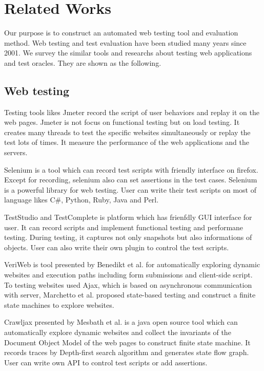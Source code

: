 
\chapter{Related Works}\label{ch:related}

Our purpose is to construct an automated web testing tool and evaluation method.
Web testing and test evaluation have been studied many years since 2001\cite{WebTesting}.
We survey the similar tools\cite{WebToolsList}  and researchs about testing web applications and test oracles.
They are shown as the following.


\section{Web testing}

Testing tools likes Jmeter\cite{jmeter} record the script of user behaviors and replay it on the web pages.
Jmeter is not focus on functional testing but on load testing.
It creates many threads to test the specific websites simultaneously or replay the test lots of times.
It measure the performance of the web applications and the servers.

Selenium\cite{selenium} is a tool which can record test scripts with friendly interface on firefox.
Except for recording, selenium also can set assertions in the test cases.
Selenium is a powerful library for web testing.
User can write their test scripts on most of language likes C\#, Python, Ruby, Java and Perl.

TestStudio\cite{Teststudio} and TestComplete\cite{Smartbear} is platform which has frienfdly GUI interface for user.
It can record scripts and implement functional testing and performane testing.
During testing, it captures not only snapshots but also informations of objects.
User can also write their own plugin to control the test scripts.

VeriWeb is tool presented by Benedikt et al.\cite{veriweb}
for automatically exploring dynamic websites and execution paths including form submissions and client-side script.
To testing websites used Ajax, which is based on asynchronous communication with server,
Marchetto et al.\cite{Search-BasedTesting} proposed state-based testing and construct a finite state machines to explore websites.

Crawljax\cite{crawljax} presented by Mesbath et al. is a java open source tool 
which can automatically explore dynamic websites and 
collect the invariants of the Document Object Model of the web pages to construct finite state machine.
It records traces by Depth-first search algorithm and generates state flow graph.
User can write own API to control test scripts or add assertions.

